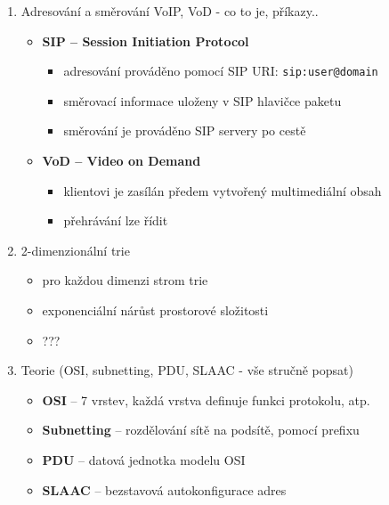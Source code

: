 \documentclass[12pt,a4paper,titlepage,final]{article}
\begin{document}
\begin{enumerate}
	\item Adresování a směrování VoIP, VoD - co to je, příkazy..
	\begin{itemize}
		\item \textbf{SIP -- Session Initiation Protocol}
		\begin{itemize}
			\item adresování prováděno pomocí SIP URI: \texttt{sip:user@domain}
			\item směrovací informace uloženy v SIP hlavičce paketu
			\item směrování je prováděno SIP servery po cestě
		\end{itemize}
		\item \textbf{VoD -- Video on Demand} 
		\begin{itemize}	
			\item klientovi je zasílán předem vytvořený multimediální obsah
			\item přehrávání lze řídit
		\end{itemize}
	\end{itemize}

	\item 2-dimenzionální trie
	\begin{itemize}
		\item pro každou dimenzi strom trie
		\item exponenciální nárůst prostorové složitosti
		\item ???	
	\end{itemize}

	\item Teorie (OSI, subnetting, PDU, SLAAC - vše stručně popsat)
	\begin{itemize}
		\item \textbf{OSI} -- 7 vrstev, každá vrstva definuje funkci protokolu, atp.
		\item \textbf{Subnetting} -- rozdělování sítě na podsítě, pomocí prefixu
		\item \textbf{PDU} -- datová jednotka modelu OSI
		\item \textbf{SLAAC} -- bezstavová autokonfigurace adres
	\end{itemize}
	

\end{enumerate}
\end{document}
